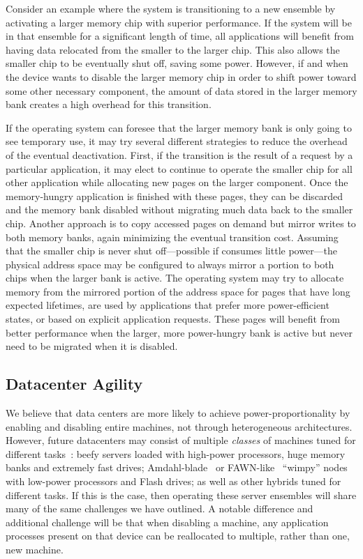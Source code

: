 Consider an example where the system is transitioning to a new ensemble by
activating a larger memory chip with superior performance. If the system will
be in that ensemble for a significant length of time, all applications will
benefit from having data relocated from the smaller to the larger chip. This
also allows the smaller chip to be eventually shut off, saving some power.
However, if and when the device wants to disable the larger memory chip in
order to shift power toward some other necessary component, the amount of
data stored in the larger memory bank creates a high overhead for this
transition.

If the operating system can foresee that the larger memory bank is only going
to see temporary use, it may try several different strategies to reduce the
overhead of the eventual deactivation. First, if the transition is the result
of a request by a particular application, it may elect to continue to operate
the smaller chip for all other application while allocating new pages on the
larger component. Once the memory-hungry application is finished with these
pages, they can be discarded and the memory bank disabled without migrating
much data back to the smaller chip. Another approach is to copy accessed
pages on demand but mirror writes to both memory banks, again minimizing the
eventual transition cost. Assuming that the smaller chip is never shut off---possible if consumes little power---the physical address space may be
configured to always mirror a portion to both chips when the larger bank is
active. The operating system may try to allocate memory from the mirrored
portion of the address space for pages that have long expected lifetimes, are
used by applications that prefer more power-efficient states, or based on
explicit application requests. These pages will benefit from better
performance when the larger, more power-hungry bank is active but never need
to be migrated when it is disabled.

\subsection{Datacenter Agility}

We believe that data centers are more likely to achieve power-proportionality
by enabling and disabling entire machines, not through heterogeneous
architectures. However, future datacenters may consist of multiple
\textit{classes} of machines tuned for different
tasks~\cite{chun-hybriddatacenters}: beefy servers loaded with high-power
processors, huge memory banks and extremely fast drives;
Amdahl-blade~\cite{szalay-amdahl} or FAWN-like~\cite{andersen-fawn} ``wimpy''
nodes with low-power processors and Flash drives; as well as other hybrids
tuned for different tasks. If this is the case, then operating these server
ensembles will share many of the same challenges we have outlined. A notable
difference and additional challenge will be that when disabling a machine, any
application processes present on that device can be reallocated to multiple,
rather than one, new machine.
